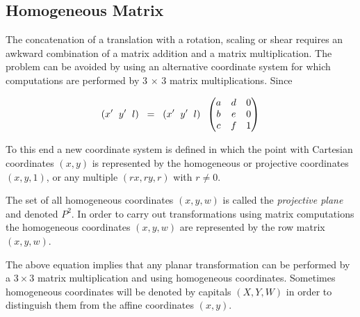 \documentclass[12pt]{report}
\begin{document}
\subsection{Homogeneous Matrix}

\noindent The concatenation of a translation with a rotation, scaling or shear requires an awkward combination of a matrix addition and a matrix multiplication. The problem can be avoided by using an alternative coordinate system for which computations are performed by 3 $ \times $ 3 matrix multiplications. Since 

\begin{center}
\[ (x' \hspace{.2cm}  y' \hspace{.2cm}  l ) \hspace{.2cm} = \hspace{.2cm} (x' \hspace{.2cm}  y' \hspace{.2cm} l )    \hspace{0.2cm} \begin{pmatrix}
a & d & 0 \\
b & e & 0 \\
c & f & 1 
\end{pmatrix} \]
  
\end{center}

To this end a new coordinate system is defined in which the point with Cartesian coordinates $ (x , y) $ is represented by the homogeneous or projective coordinates $( x , y , 1 )$, or any multiple $( rx , ry , r )$ with $ r \neq 0 $.


\vspace{.5cm}
The set of all homogeneous coordinates $(x , y , w)$ is called the \textit{projective plane} and denoted $ P^2 $. In order to carry out transformations using matrix computations the homogeneous coordinates $( x, y, w )$ are represented by the row matrix $(x, y, w)$. 

\vspace{.5cm}

\hspace{1cm} The above equation implies that any planar transformation can be performed by a $ 3 \times 3 $ matrix multiplication and using homogeneous coordinates. Sometimes homogeneous coordinates will be denoted by capitals $ (X, Y, W) $  in order to distinguish them from the affine coordinates $(x, y)$.
\end{document}
